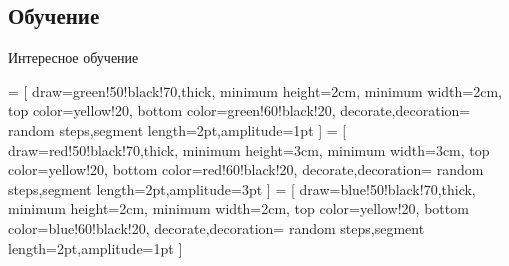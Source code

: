 \subsection{Обучение}

\begin{frame}{Интересное обучение}
    \begin{center}
         = [
            draw=green!50!black!70,thick,
            minimum height=2cm,
            minimum width=2cm,
            top color=yellow!20,
            bottom color=green!60!black!20,
            decorate,decoration={
                random steps,segment length=2pt,amplitude=1pt
            }
        ]
         = [
            draw=red!50!black!70,thick,
            minimum height=3cm,
            minimum width=3cm,
            top color=yellow!20,
            bottom color=red!60!black!20,
            decorate,decoration={
                random steps,segment length=2pt,amplitude=3pt
            }
        ]
         = [
            draw=blue!50!black!70,thick,
            minimum height=2cm,
            minimum width=2cm,
            top color=yellow!20,
            bottom color=blue!60!black!20,
            decorate,decoration={
                random steps,segment length=2pt,amplitude=1pt
            }
        ]
\end{center}
\end{frame}

